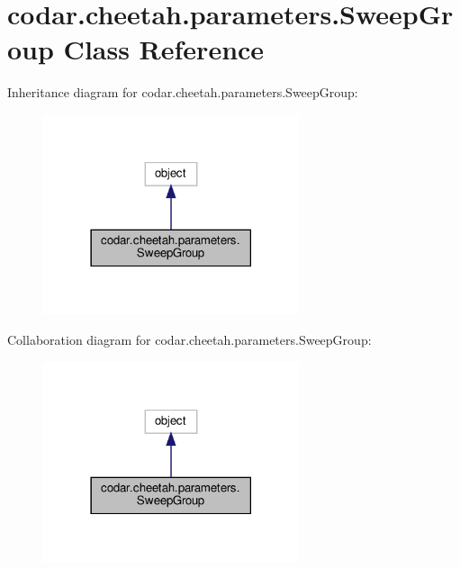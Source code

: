 \hypertarget{classcodar_1_1cheetah_1_1parameters_1_1_sweep_group}{}\section{codar.\+cheetah.\+parameters.\+Sweep\+Group Class Reference}
\label{classcodar_1_1cheetah_1_1parameters_1_1_sweep_group}


Inheritance diagram for codar.\+cheetah.\+parameters.\+Sweep\+Group\+:
\nopagebreak
\begin{figure}[H]
\begin{center}
\leavevmode
\includegraphics[width=213pt]{classcodar_1_1cheetah_1_1parameters_1_1_sweep_group__inherit__graph}
\end{center}
\end{figure}


Collaboration diagram for codar.\+cheetah.\+parameters.\+Sweep\+Group\+:
\nopagebreak
\begin{figure}[H]
\begin{center}
\leavevmode
\includegraphics[width=213pt]{classcodar_1_1cheetah_1_1parameters_1_1_sweep_group__coll__graph}
\end{center}
\end{figure}
